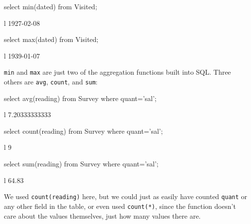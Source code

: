 \begin{VerbIn}
select min(dated) from Visited;
\end{VerbIn}

\begin{sqltable}{l}
1927-02-08 \\
\end{sqltable}


\begin{VerbIn}
select max(dated) from Visited;
\end{VerbIn}

\begin{sqltable}{l}
1939-01-07 \\
\end{sqltable}

\texttt{min} and \texttt{max} are just two of the aggregation functions
built into SQL. Three others are \texttt{avg}, \texttt{count}, and
\texttt{sum}:

\begin{VerbIn}
select avg(reading) from Survey where quant='sal';
\end{VerbIn}

\begin{sqltable}{l}
7.20333333333 \\
\end{sqltable}

\begin{VerbIn}
select count(reading) from Survey where quant='sal';
\end{VerbIn}

\begin{sqltable}{l}
9 \\
\end{sqltable}

\begin{VerbIn}
select sum(reading) from Survey where quant='sal';
\end{VerbIn}

\begin{sqltable}{l}
64.83 \\
\end{sqltable}

We used \texttt{count(reading)} here, but we could just as easily have
counted \texttt{quant} or any other field in the table, or even used
\texttt{count(*)}, since the function doesn't care about the values
themselves, just how many values there are.

